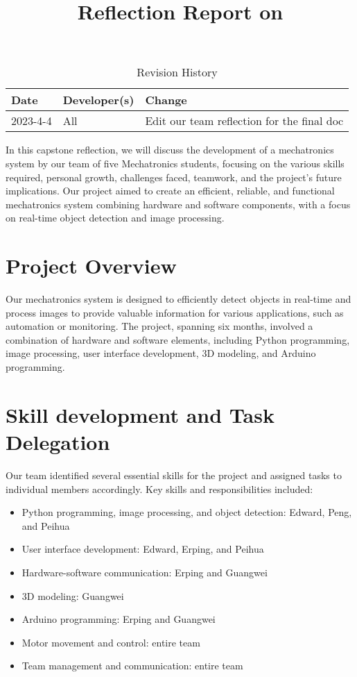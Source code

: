 \documentclass{article}
\title{Reflection Report on \progname}
\author{\authname}
\date{}
\begin{document}
\begin{table}[hp]
\caption{Revision History} \label{TblRevisionHistory}
\begin{tabularx}{\textwidth}{llX}
\toprule
\textbf{Date} & \textbf{Developer(s)} & \textbf{Change}\\
\midrule
2023-4-4 & All & Edit our team reflection for the final doc\\
\bottomrule
\end{tabularx}
\end{table}

\newpage

\maketitle

In this capstone reflection, we will discuss the development of a mechatronics system by our team of five Mechatronics students, focusing on the various skills required, personal growth, challenges faced, teamwork, and the project's future implications. Our project aimed to create an efficient, reliable, and functional mechatronics system combining hardware and software components, with a focus on real-time object detection and image processing.

\section{Project Overview}
Our mechatronics system is designed to efficiently detect objects in real-time and process images to provide valuable information for various applications, such as automation or monitoring. The project, spanning six months, involved a combination of hardware and software elements, including Python programming, image processing, user interface development, 3D modeling, and Arduino programming.
\section{Skill development and Task Delegation}
Our team identified several essential skills for the project and assigned tasks to individual members accordingly. Key skills and responsibilities included:
\begin{itemize}
    \item Python programming, image processing, and object detection: Edward, Peng, and Peihua
    \item User interface development: Edward, Erping, and Peihua
    \item Hardware-software communication: Erping and Guangwei
    \item 3D modeling: Guangwei
    \item Arduino programming: Erping and Guangwei
    \item Motor movement and control: entire team
    \item Team management and communication: entire team
\end{itemize}
\end{document}

